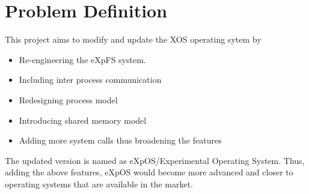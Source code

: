 \chapter{Problem Definition}
\label{chap1}
  This project aims to modify and update the XOS operating sytem  by
\begin{itemize}
\item Re-engineering the eXpFS system. 
\item Including inter process communication
\item Redesigning process model 
\item Introducing shared memory model 
\item Adding more system calls thus broadening the features
\end {itemize}
The updated version is named as eXpOS/Experimental Operating System. 
Thus, adding the above features, eXpOS would become more advanced and closer to operating systems that are available in the market.
